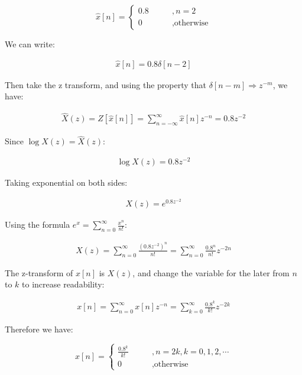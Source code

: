 \documentclass{article}
\begin{document}
\begin{equation*}
\hat{x}[n] = 
    \begin{cases}
    0.8 \qquad &,n = 2 \\
    0 &, \text{otherwise}
\end{cases}
\end{equation*}

We can write:

\begin{align*}
    \hat{x}[n] = 0.8 \delta[n - 2]
\end{align*}

Then take the z transform, and using the property that $\delta[n - m] \Rightarrow z^{-m}$, we have:

\begin{align*}
    \hat{X}(z) = Z[\hat{x}[n]] = \sum_{n=-\infty}^{\infty} \hat{x}[n] z^{-n} = 0.8 z^{-2}
\end{align*}

Since $\log X(z) = \hat{X}(z)$:

\begin{align*}
    \log X(z) = 0.8 z^{-2}
\end{align*}

Taking exponential on both sides:

\begin{align*}
    X(z) = e^{0.8 z^{-2}}
\end{align*}

Using the formula $e^x = \sum_{n=0}^{\infty} \frac{x^n}{n!}$:

\begin{align*}
    X(z) = \sum_{n=0}^{\infty} \frac{(0.8 z^{-2})^n}{n!} = \sum_{n=0}^{\infty} \frac{0.8^n}{n!} z^{-2n}
\end{align*}

The z-transform of $x[n]$ is $X(z)$, and change the variable for the later from $n$ to $k$ to increase readability:

\begin{align*}
    x[n] = \sum_{n=0}^{\infty}x[n] z^{-n} = \sum_{k=0}^{\infty} \frac{0.8^k}{k!} z^{-2k}
\end{align*}

Therefore we have:

\begin{equation*}
x[n] = 
    \begin{cases}
    \frac{0.8^k}{k!} \qquad &,n = 2k, k = 0, 1, 2, \cdots \\
    0 &, \text{otherwise}
    \end{cases}
\end{equation*}
\end{document}
